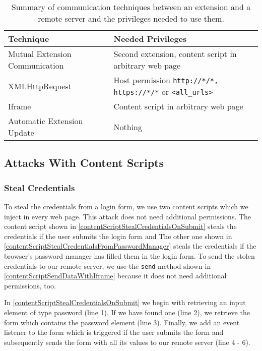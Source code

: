 	\begin{table}[h]
		\centering
		\begin{tabular}{|l|l|} \hline
			\textbf{Technique} & \textbf{Needed Privileges} \\ \hline
			Mutual Extension Communication & Second extension, content script in arbitrary web page \\
			XMLHttpRequest & Host permission \texttt{http://*/*, https://*/*} or \texttt{<all\_urls>} \\
			Iframe & Content script in arbitrary web page \\
			Automatic Extension Update & Nothing \\ 
			\hline
		\end{tabular}
		\caption{Summary of communication techniques between an extension and a remote server and the privileges needed to use them.}
		\label{tab:permissionsRemoteCommunication}
	\end{table}
	
\subsection{Attacks With Content Scripts}

\subsubsection{Steal Credentials}
	
	To steal the credentials from a login form, we use two content scripts which we inject in every web page. This attack does not need additional permissions. The content script shown in \autoref{contentScriptStealCredentialsOnSubmit} steals the credentials if the user submits the login form and The other one shown in \autoref{contentScriptStealCredentialsFromPasswordManager} steals the credentials if the browser's password manager has filled them in the login form. To send the stolen credentials to our remote server, we use the \texttt{send} method shown in \autoref{contentScriptSendDataWithIframe} because it does not need additional permissions, too. 
	
	In \autoref{contentScriptStealCredentialsOnSubmit} we begin with retrieving an input element of type password (line 1). If we have found one (line 2), we retrieve the form which contains the password element (line 3). Finally, we add an event listener to the form which is triggered if the user submits the form and subsequently sends the form with all its values to our remote server (line 4 - 6). 
	

